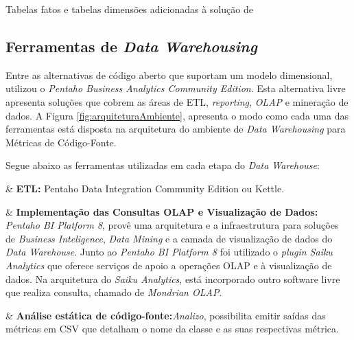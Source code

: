 \begin{table}[!ht]
	\begin{center}
	
	 
	\caption{Tabelas fatos e tabelas dimensões adicionadas à solução de }
	\label{tab:tabelas-fatos-dimensoes-nilton}
	\end{center}
	\end{table}	
	\FloatBarrier

\subsection{Ferramentas de \textit{Data Warehousing}}
\label{ferramentas}

Entre as alternativas de código aberto que suportam um modelo dimensional,   utilizou o \textit{Pentaho Business Analytics Community Edition}. Esta alternativa livre apresenta soluções que cobrem as áreas de ETL, \textit{reporting}, \textit{OLAP} e mineração de dados. A Figura \ref{fig:arquiteturaAmbiente}, apresenta o modo como cada uma das ferramentas está disposta na arquitetura do ambiente de \textit{Data Warehousing} para Métricas de Código-Fonte.

Segue abaixo as ferramentas utilizadas em cada etapa do \textit{Data Warehouse}:

\begin{easylist}[itemize]

	& \textbf{ETL:} Pentaho Data Integration Community Edition ou Kettle.
	 
	& \textbf{Implementação das Consultas OLAP e Visualização de Dados:} \textit{Pentaho BI Platform 8}, provê uma arquitetura e a infraestrutura para soluções de \textit{Business Inteligence}, \textit{Data Mining} e a camada de visualização de dados do \textit{Data Warehouse}. Junto ao \textit{Pentaho BI Platform 8} foi utilizado o \textit{plugin Saiku Analytics} que oferece serviços de apoio a operações OLAP e à visualização de dados. Na arquitetura do \textit{Saiku Analytics}, está incorporado outro software livre que realiza consulta, chamado de \textit{Mondrian OLAP}. 
	
	& \textbf{Análise estática de código-fonte:}\textit{Analizo}, possibilita emitir saídas das métricas em CSV que detalham o nome da classe e as suas respectivas métrica.

	\end{easylist}
	
